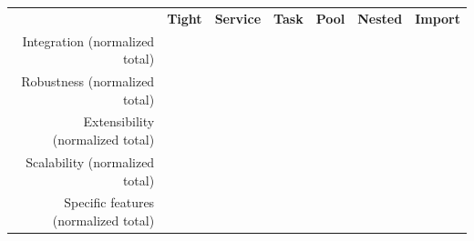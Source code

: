 \documentclass[preprint,3p,twocolumn]{elsarticle}
\begin{document}
\begin{table}
\footnotesize
\centering
\begin{tabular}{rcccccc}
                                    & \textbf{Tight}
                                    & \textbf{Service}
                                    & \textbf{Task}
                                    & \textbf{Pool}
                                    & \textbf{Nested}
                                    & \textbf{Import} \\
  Integration (normalized total)    &
                                    \cellcolor[HTML]{99FF99}{0.00}
                                    & \cellcolor[HTML]{99E899}{0.22}
                                    & \cellcolor[HTML]{99FF99}{0.00}
                                    & \cellcolor[HTML]{99D199}{0.44}
                                    & \cellcolor[HTML]{999999}{1.00}
                                      & \cellcolor[HTML]{99DD99}{0.33}\\
Robustness (normalized total) &
                                \cellcolor[HTML]{99F099}{0.14}
                                    & \cellcolor[HTML]{99D399}{0.43}
                                    & \cellcolor[HTML]{99FF99}{0.00}
                                    & \cellcolor[HTML]{99B699}{0.71}
                                    & \cellcolor[HTML]{999999}{1.00}
                                    & \cellcolor[HTML]{99D399}{0.43}\\
  Extensibility (normalized total)  & \cellcolor[HTML]{99D199}{0.44}
                                     & \cellcolor[HTML]{99D199}{0.44}
                                     & \cellcolor[HTML]{99FF99}{0.00}
                                     & \cellcolor[HTML]{99E899}{0.22}
                                     & \cellcolor[HTML]{999999}{1.00}
                                     & \cellcolor[HTML]{99E899}{0.22}\\
Scalability (normalized total)  & \cellcolor[HTML]{999999}{1.00}
                                     & \cellcolor[HTML]{99CC99}{0.50}
                                     & \cellcolor[HTML]{99CC99}{0.50}
                                     & \cellcolor[HTML]{99FF99}{0.00}
                                     & \cellcolor[HTML]{99CC99}{0.50}
                                     & \cellcolor[HTML]{99CC99}{0.50}\\
Specific features (normalized total) & \cellcolor[HTML]{99CC99}{0.50}
                                     & \cellcolor[HTML]{99CC99}{0.50}
                                     & \cellcolor[HTML]{999999}{1.00}

\end{tabular}
\end{table}
\end{document}
